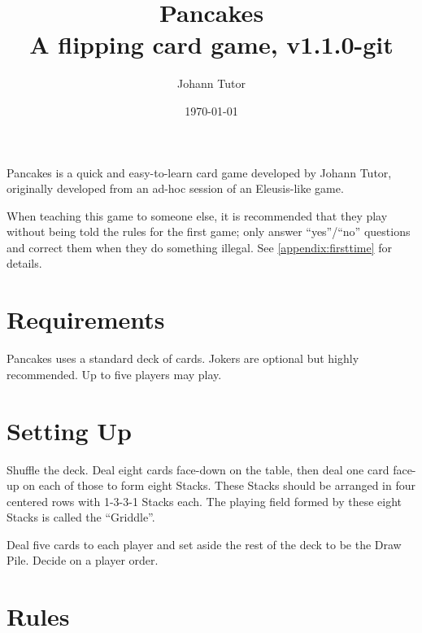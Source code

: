 \documentclass{article}
\newcommand\theversion{1.1.0-git}
\begin{document}
\title{Pancakes\\ \large A flipping card game, v\theversion}
\author{Johann Tutor}
\date{\today}
\maketitle


Pancakes is a quick and easy-to-learn card game developed by Johann Tutor, originally developed from an ad-hoc session of an Eleusis-like game.

When teaching this game to someone else, it is recommended that they play without being told the rules for the first game;
only answer ``yes''/``no'' questions and correct them when they do something illegal. See \autoref{appendix:firsttime} for details.

\tableofcontents

\newpage

\section{Requirements \label{sec:requirements}}

Pancakes uses a standard deck of cards. Jokers are optional but highly recommended.
Up to five players may play.

\section{Setting Up \label{sec:setup}}

Shuffle the deck. Deal eight cards face-down on the table, then deal one card face-up on each of those to form eight Stacks.
These Stacks should be arranged in four centered rows with 1-3-3-1 Stacks each.
The playing field formed by these eight Stacks is called the ``Griddle''.

Deal five cards to each player and set aside the rest of the deck to be the Draw Pile. Decide on a player order.

\section{Rules \label{sec:rules}}
\end{document}
